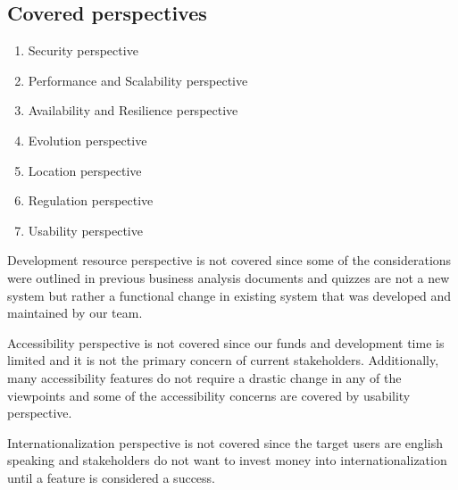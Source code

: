 \subsection{Covered perspectives}

\begin{enumerate}
    \item Security perspective
    \item Performance and Scalability perspective
    \item Availability and Resilience perspective
    \item Evolution perspective
    \item Location perspective
    \item Regulation perspective
    \item Usability perspective
\end{enumerate}

Development resource perspective is not covered since some of the considerations were outlined in previous business analysis documents and quizzes are not a new system but rather a functional change in existing system that was developed and maintained by our team.

Accessibility perspective is not covered since our funds and development time is limited and it is not the primary concern of current stakeholders. Additionally, many accessibility features do not require a drastic change in any of the viewpoints and some of the accessibility concerns are covered by usability perspective.

Internationalization perspective is not covered since the target users are english speaking and stakeholders do not want to invest money into internationalization until a feature is considered a success.


